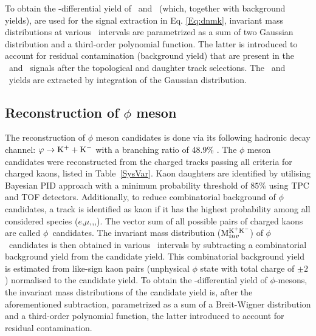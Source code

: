 To obtain the \pT-differential yield of \Ks~and \lambdas~(which, together with background yields), are used for the signal extraction in Eq. \ref{Eq:dnmk}, invariant mass distributions at various \pT~intervals are parametrized as a sum of two Gaussian distribution and a third-order polynomial function. The latter is introduced to account for residual contamination (background yield) that are present in the \Ks~and \lambdas~signals after the topological and daughter track selections. The \Ks~and \lambdas~yields are extracted by integration of the Gaussian distribution. %

\subsection{Reconstruction of $\phi$ meson}
\label{SubSec:PhiRec}

The reconstruction of $\phi$ meson candidates is done via its following hadronic decay channel: $\varphi \rightarrow {\rm K}^{+} + {\rm K}^{-}$ with a branching ratio of 48.9\% \cite{Olive_2016}. The $\phi$ meson candidates were reconstructed from the charged tracks passing all criteria for charged kaons, listed in Table~\ref{SysVar}. Kaon daughters are identified by utilising Bayesian PID approach with a minimum probability threshold of $85\%$ using TPC and TOF detectors. Additionally, to reduce combinatorial background of $\phi$ candidates, a track is identified as kaon if it has the highest probability among all considered species ($e$,$\mu$,\pion,\kaon,\proton). The vector sum of all possible pairs of charged kaons are called $\phi$~candidates. The invariant mass distribution (${\rm M}_{inv}^{\rm K^{+}K^{-}}$) of $\phi$~candidates is then obtained in various \pT~intervals by subtracting a combinatorial background yield from the candidate yield. This combinatorial background yield is estimated from like-sign kaon pairs (unphysical $\phi$ state with total charge of $\pm2$) normalised to the candidate yield. To obtain the \pT-differential yield of $\phi$-mesons, the invariant mass distributions of the candidate yield is, after the aforementioned subtraction, parametrized as a sum of a Breit-Wigner distribution and a third-order polynomial function, the latter introduced to account for residual contamination.




